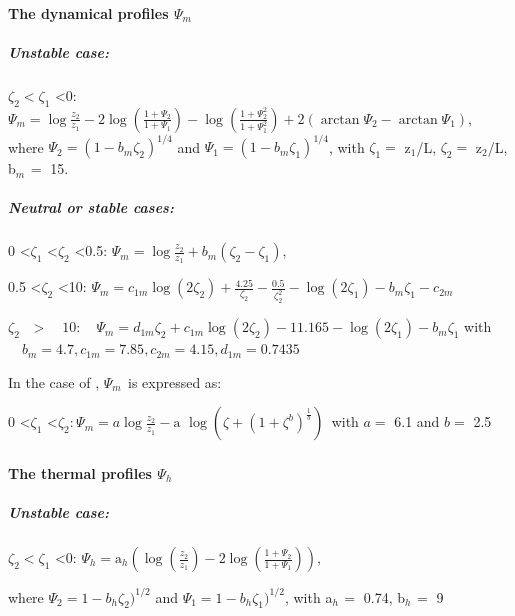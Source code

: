 \paragraph{The dynamical profiles $\Psi_{m}$}

\subparagraph{Unstable case:}

$\zeta_{2}< \zeta_{1}$ \textless 0:
$\Psi_{m} =\log \frac{z_{2}}{z_{1}}-2\log \left({\frac{1+\Psi_{2} }{1+\Psi_{1} }}\right)-\log
\left( {\frac{1+\Psi_{2}^{2} }{1+\Psi_{1}^{2} }} \right)+2\left( {\arctan
\Psi_{2} -\arctan \Psi_{1} } \right)$,
\newline
where $\Psi_{2}= (1-b_{m} \zeta_{2})^{1/4}$ and $\Psi_{1} =(1-b_{m} \zeta_{1})^{1/4}$,
\newline
with $\zeta_{1}= $ z$_{1}$/L, $\zeta_{2}= $ z$_{2}$/L, b$_{m\, }= $ 15.

\subparagraph{Neutral or stable cases:}

0 \textless $\zeta_{1}$ \textless $\zeta_{2}$ \textless 0.5:
$\Psi_{m} =\log\frac{z_{2} }{z_{1} }+b_{m} \left( {\zeta_{2} -\zeta_{1} } \right)$,

0.5 \textless $\zeta_{2}$ \textless 10:
$\Psi_{m} =c_{1m} \log(2\zeta_{2})+\frac{4.25}{\zeta_{2}}-\frac{0.5}{\zeta_{2}^{2}}-\log(2\zeta_{1} )-b_{m} \zeta_{1} -c_{2m} $

$\zeta_{2\quad }>\quad 10:
\quad
\Psi_{m} =d_{1m} \zeta_{2}
+c_{1m} \log\left( {2\zeta_{2} }
\right)-\mbox{11.165}-\log(2\zeta_{1}
)-b_{m} \zeta_{1}
$
\newline
with $\quad b_{m} = 4.7, c_{1m} = 7.85, c_{2m} = 4.15, d_{1m} = 0.7435$

In the case of \cite{Cheng:2005}, $\Psi_{m\, }$ is expressed as:

0 \textless $\zeta_{1}$ \textless $\zeta_{2}$:$_{\, }\Psi_{m} =a \log\frac{z_{2} }{z_{1}
}-\mbox{a}\,\,\log\left( {\zeta+\left( {1+\zeta^{b}} \right)^{\frac{1}{b}}} \right)_{\, }$ with $a
=$ 6.1 and $b =$ 2.5

\paragraph{The thermal profiles $\Psi_{h}$}

\subparagraph{Unstable case:}

$\zeta_{2 }< \zeta_{1}$ \textless 0: $\Psi_{h}
=\mbox{a}_{h} \left( {\log \left( {\frac{z_{2}
}{z_{1} }} \right)- 2\log \left(
{\frac{1+\Psi_{2} }{1+\Psi_{1}
}} \right)} \right)$,

where $\Psi_{2} =1-b_{h} \zeta_{2} )^{1/2}$ and $\Psi_{1}
=1-b_{h} \zeta_{1}
)^{1/2}$, with a$_{h\, }=$ 0.74, b$_{h\, }=$ 9

